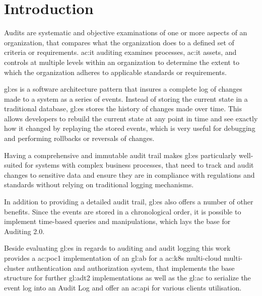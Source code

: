 %
\chapter{Introduction}

Audits are systematic and objective examinations of one or more aspects of an organization, that compares what the organization does to a defined set of criteria or requirements. \gls{ac:it} auditing examines processes, \gls{ac:it} assets, and controls at multiple levels within an organization to determine the extent to which the organization adheres to applicable standards or requirements. 

\gls{gl:es} is a software architecture pattern that insures a complete log of changes made to a system as a series of events. Instead of storing the current state in a traditional database, \gls{gl:es} stores the history of changes made over time. This allows developers to rebuild the current state at any point in time and see exactly how it changed by replaying the stored events, which is very useful for debugging and performing rollbacks or reversals of changes.

Having a comprehensive and immutable audit trail makes \gls{gl:es} particularly well-suited for systems with complex business processes, that need to track and audit changes to sensitive data and ensure they are in compliance with regulations and standards without relying on traditional logging mechanisms.

In addition to providing a detailed audit trail, \gls{gl:es} also offers a number of other benefits. Since the events are stored in a chronological order, it is possible to implement time-based queries and manipulations, which lays the base for Auditing 2.0.

Beside evaluating \gls{gl:es} in regards to auditing and audit logging this work provides a \gls{ac:poc1} implementation of an \gls{gl:ab} for a \gls{ac:k8s} multi-cloud multi-cluster authentication and authorization system, that implements the base structure for further \gls{gl:adt2} implementations as well as the \gls{gl:ac} to serialize the event log into an Audit Log and offer an \gls{ac:api} for various clients utilisation.